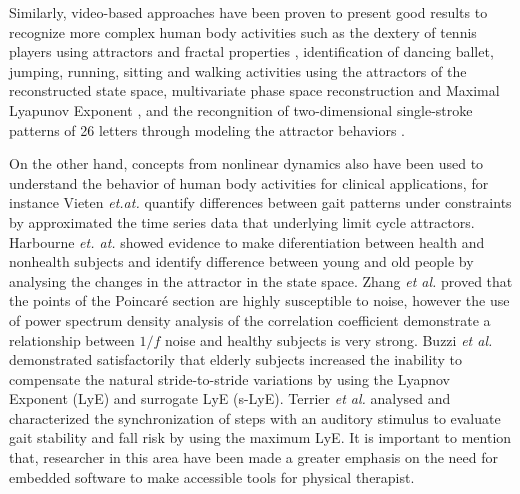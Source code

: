 Similarly, video-based approaches have been proven to present good results 
to recognize more complex human body activities such as the dextery of tennis players 
using attractors and fractal properties \cite{Yamamoto2000,Suzuki2013} 
, identification of dancing ballet, jumping, running, sitting and walking activities
using the attractors of the reconstructed state space, 
multivariate phase space reconstruction
and Maximal Lyapunov Exponent 
\cite{Ali2007,Basharat2009,Venkataraman2013}, and the recongnition of 
two-dimensional single-stroke patterns of 26 letters 
through modeling the attractor behaviors \cite{Ijspeert2013}. 

On the other hand, concepts from nonlinear dynamics also have been used to understand 
the behavior of human body activities for clinical applications, for instance
Vieten \emph{et.at.} \cite{Vieten2013} quantify differences between gait patterns 
under constraints by approximated the time series data that underlying limit cycle 
attractors. 
Harbourne \emph{et. at.} \cite{Harbourne2009} showed evidence 
to make diferentiation between health and nonhealth subjects
and identify difference between young and old people by analysing the changes in the 
attractor in the state space.
Zhang \textit{et al.} \cite{Zhang2010} 
proved that the points of the Poincar\'e section are highly susceptible 
to noise, however the use of power spectrum density analysis of the correlation 
coefficient demonstrate a relationship between $1/f$ noise and healthy subjects 
is very strong.
Buzzi \textit{et al.} \cite{Buzzi2003} demonstrated satisfactorily that elderly 
subjects increased the inability to compensate the natural stride-to-stride variations
by using the Lyapnov Exponent (LyE) and surrogate LyE (s-LyE).
Terrier \textit{et al.} \cite{Terrier2013} analysed and characterized the 
synchronization of steps with an auditory stimulus to evaluate gait stability 
and fall risk by using the maximum LyE.
It is important to mention that, researcher in this area have been made 
a greater emphasis on the need for embedded software to make accessible 
tools for physical therapist.



